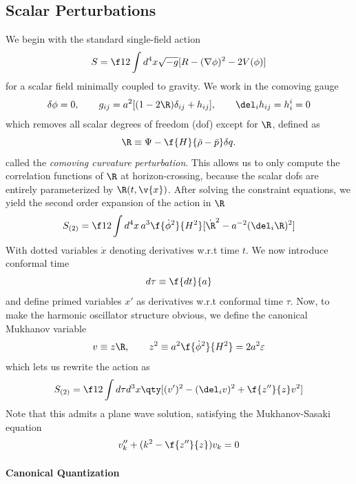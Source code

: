 
\subsection{Scalar Perturbations}
We begin with the standard single-field action 
\begin{equation}
    \label{eq:stdsinglefield}
    S=\f12 \int d^4x \sqrt{-g} [R -(\nabla\phi)^2-2V(\phi)]
\end{equation}
for a scalar field minimally coupled to gravity. We work in the comoving gauge
\begin{equation}
    \label{eq:gauges}
    \delta\phi=0, \qquad g_{ij}=a^2[(1-2\R )\delta_{ij}+h_{ij}], \qquad \del_ih_{ij}=h^i_i=0
\end{equation}
which removes all scalar degrees of freedom (dof) except for $\R $, defined as
\begin{equation}
    \R \equiv \Psi-\f{H}{\Bar{\rho}-\Bar{p}}\delta q.
\end{equation}
called the \textit{comoving curvature perturbation}. This allows us to only compute the correlation functions of $\R $ at horizon-crossing, because the scalar dofs are entirely parameterized by $\R (t,\v{x})$. After solving the constraint equations, we yield the second order expansion of the action in $\R$
\begin{equation}
    \label{eq:secorderstdaction}
    S_{(2)}=\f12 \int d^4x\, a^3 \f{\dot \phi^2}{H^2}[\dot{\R }^2-a^{-2}(\del_i \R )^2]
\end{equation}
With dotted variables $\dot{x}$ denoting derivatives w.r.t time $t$. We now introduce conformal time
\[
d\tau\equiv \f{dt}{a}
\]
and define primed variables $x'$ as derivatives w.r.t conformal time $\tau$. Now, to make the harmonic oscillator structure obvious, we define the canonical Mukhanov variable
\begin{equation}
    v\equiv z\R, \qquad z^2\equiv a^2\f{\dot{\phi}^2}{H^2}=2a^2\varepsilon
\end{equation}
which lets us rewrite the action as
\begin{equation}
S_{(2)} = \f12 \int d\tau d^3x
\qty[(v')^2 - (\del_i v)^2 + \f{z''}{z} v^2]
\end{equation}
Note that this admits a plane wave solution, satisfying the Mukhanov-Sasaki equation
\begin{equation}
    v_k''+(k^2-\f{z''}{z})v_k=0
\end{equation}


\paragraph{Canonical Quantization}


